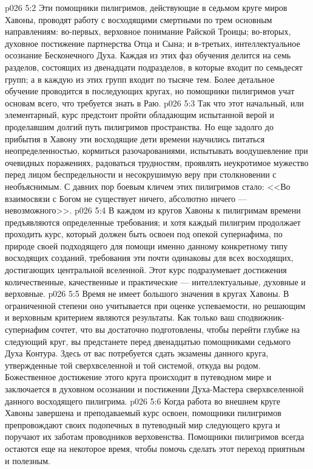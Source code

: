 \vs p026 5:2 Эти помощники пилигримов, действующие в седьмом круге миров Хавоны, проводят работу с восходящими смертными по трем основным направлениям: во\hyp{}первых, верховное понимание Райской Троицы; во\hyp{}вторых, духовное постижение партнерства Отца и Сына; и в\hyp{}третьих, интеллектуальное осознание Бесконечного Духа. Каждая из этих фаз обучения делится на семь разделов, состоящих из двенадцати подразделов, в которые входит по семьдесят групп; а в каждую из этих групп входит по тысяче тем. Более детальное обучение проводится в последующих кругах, но помощники пилигримов учат основам всего, что требуется знать в Раю.
\vs p026 5:3 Так что этот начальный, или элементарный, курс предстоит пройти обладающим испытанной верой и проделавшим долгий путь пилигримов пространства. Но еще задолго до прибытия в Хавону эти восходящие дети времени научились питаться неопределенностью, кормиться разочарованиями, испытывать воодушевление при очевидных поражениях, радоваться трудностям, проявлять неукротимое мужество перед лицом беспредельности и несокрушимую веру при столкновении с необъяснимым. С давних пор боевым кличем этих пилигримов стало: <<Во взаимосвязи с Богом не существует ничего, абсолютно ничего --- невозможного>>.
\vs p026 5:4 В каждом из кругов Хавоны к пилигримам времени предъявляются определенные требования; и хотя каждый пилигрим продолжает проходить курс, который должен быть освоен под опекой супернафима, по природе своей подходящего для помощи именно данному конкретному типу восходящих созданий, требования эти почти одинаковы для всех восходящих, достигающих центральной вселенной. Этот курс подразумевает достижения количественные, качественные и практические --- интеллектуальные, духовные и верховные.
\vs p026 5:5 Время не имеет большого значения в кругах Хавоны. В ограниченной степени оно учитывается при оценке успеваемости, но решающим и верховным критерием являются результаты. Как только ваш сподвижник\hyp{}супернафим сочтет, что вы достаточно подготовлены, чтобы перейти глубже на следующий круг, вы предстанете перед двенадцатью помощниками седьмого Духа Контура. Здесь от вас потребуется сдать экзамены данного круга, утвержденные той сверхвселенной и той системой, откуда вы родом. Божественное достижение этого круга происходит в путеводном мире и заключается в духовном осознании и постижении Духа\hyp{}Мастера сверхвселенной данного восходящего пилигрима.
\vs p026 5:6 Когда работа во внешнем круге Хавоны завершена и преподаваемый курс освоен, помощники пилигримов препровождают своих подопечных в путеводный мир следующего круга и поручают их заботам проводников верховенства. Помощники пилигримов всегда остаются еще на некоторое время, чтобы помочь сделать этот переход приятным и полезным.
